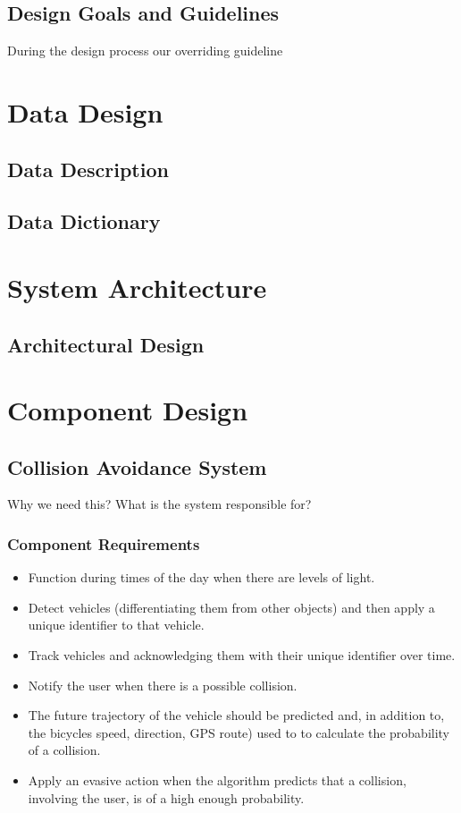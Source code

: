 \documentclass[]{report}
\begin{document}
\section{Design Goals and Guidelines}
During the design process our overriding guideline

\chapter{Data Design}
\section{Data Description}
\section{Data Dictionary}

\chapter{System Architecture}
\section{Architectural Design}
\chapter{Component Design}

\section{Collision Avoidance System}

Why we need this? What is the system responsible for?

\subsection{Component Requirements}

\begin{itemize}
  \item Function during times of the day when there are levels of light.
  \item Detect vehicles (differentiating them from other objects) and then apply a unique identifier to that vehicle.
  \item Track vehicles and acknowledging them with their unique identifier over time.
  \item Notify the user when there is a possible collision.
  \item The future trajectory of the vehicle should be predicted and, in addition to, the bicycles speed, direction, GPS route) used to to calculate the probability of a collision.
  \item Apply an evasive action when the algorithm predicts that a collision, involving the user, is of a high enough probability. 
  
\end{itemize}
\end{document}
